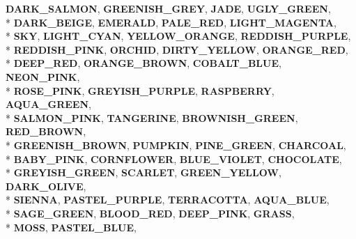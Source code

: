 \begin{DoxyCompactItemize}
{\bfseries D\+A\+R\+K\+\_\+\+S\+A\+L\+M\+ON}, 
{\bfseries G\+R\+E\+E\+N\+I\+S\+H\+\_\+\+G\+R\+EY}, 
{\bfseries J\+A\+DE}, 
{\bfseries U\+G\+L\+Y\+\_\+\+G\+R\+E\+EN}, 
\\*
{\bfseries D\+A\+R\+K\+\_\+\+B\+E\+I\+GE}, 
{\bfseries E\+M\+E\+R\+A\+LD}, 
{\bfseries P\+A\+L\+E\+\_\+\+R\+ED}, 
{\bfseries L\+I\+G\+H\+T\+\_\+\+M\+A\+G\+E\+N\+TA}, 
\\*
{\bfseries S\+KY}, 
{\bfseries L\+I\+G\+H\+T\+\_\+\+C\+Y\+AN}, 
{\bfseries Y\+E\+L\+L\+O\+W\+\_\+\+O\+R\+A\+N\+GE}, 
{\bfseries R\+E\+D\+D\+I\+S\+H\+\_\+\+P\+U\+R\+P\+LE}, 
\\*
{\bfseries R\+E\+D\+D\+I\+S\+H\+\_\+\+P\+I\+NK}, 
{\bfseries O\+R\+C\+H\+ID}, 
{\bfseries D\+I\+R\+T\+Y\+\_\+\+Y\+E\+L\+L\+OW}, 
{\bfseries O\+R\+A\+N\+G\+E\+\_\+\+R\+ED}, 
\\*
{\bfseries D\+E\+E\+P\+\_\+\+R\+ED}, 
{\bfseries O\+R\+A\+N\+G\+E\+\_\+\+B\+R\+O\+WN}, 
{\bfseries C\+O\+B\+A\+L\+T\+\_\+\+B\+L\+UE}, 
{\bfseries N\+E\+O\+N\+\_\+\+P\+I\+NK}, 
\\*
{\bfseries R\+O\+S\+E\+\_\+\+P\+I\+NK}, 
{\bfseries G\+R\+E\+Y\+I\+S\+H\+\_\+\+P\+U\+R\+P\+LE}, 
{\bfseries R\+A\+S\+P\+B\+E\+R\+RY}, 
{\bfseries A\+Q\+U\+A\+\_\+\+G\+R\+E\+EN}, 
\\*
{\bfseries S\+A\+L\+M\+O\+N\+\_\+\+P\+I\+NK}, 
{\bfseries T\+A\+N\+G\+E\+R\+I\+NE}, 
{\bfseries B\+R\+O\+W\+N\+I\+S\+H\+\_\+\+G\+R\+E\+EN}, 
{\bfseries R\+E\+D\+\_\+\+B\+R\+O\+WN}, 
\\*
{\bfseries G\+R\+E\+E\+N\+I\+S\+H\+\_\+\+B\+R\+O\+WN}, 
{\bfseries P\+U\+M\+P\+K\+IN}, 
{\bfseries P\+I\+N\+E\+\_\+\+G\+R\+E\+EN}, 
{\bfseries C\+H\+A\+R\+C\+O\+AL}, 
\\*
{\bfseries B\+A\+B\+Y\+\_\+\+P\+I\+NK}, 
{\bfseries C\+O\+R\+N\+F\+L\+O\+W\+ER}, 
{\bfseries B\+L\+U\+E\+\_\+\+V\+I\+O\+L\+ET}, 
{\bfseries C\+H\+O\+C\+O\+L\+A\+TE}, 
\\*
{\bfseries G\+R\+E\+Y\+I\+S\+H\+\_\+\+G\+R\+E\+EN}, 
{\bfseries S\+C\+A\+R\+L\+ET}, 
{\bfseries G\+R\+E\+E\+N\+\_\+\+Y\+E\+L\+L\+OW}, 
{\bfseries D\+A\+R\+K\+\_\+\+O\+L\+I\+VE}, 
\\*
{\bfseries S\+I\+E\+N\+NA}, 
{\bfseries P\+A\+S\+T\+E\+L\+\_\+\+P\+U\+R\+P\+LE}, 
{\bfseries T\+E\+R\+R\+A\+C\+O\+T\+TA}, 
{\bfseries A\+Q\+U\+A\+\_\+\+B\+L\+UE}, 
\\*
{\bfseries S\+A\+G\+E\+\_\+\+G\+R\+E\+EN}, 
{\bfseries B\+L\+O\+O\+D\+\_\+\+R\+ED}, 
{\bfseries D\+E\+E\+P\+\_\+\+P\+I\+NK}, 
{\bfseries G\+R\+A\+SS}, 
\\*
{\bfseries M\+O\+SS}, 
{\bfseries P\+A\+S\+T\+E\+L\+\_\+\+B\+L\+UE}, 

\end{DoxyCompactItemize}
